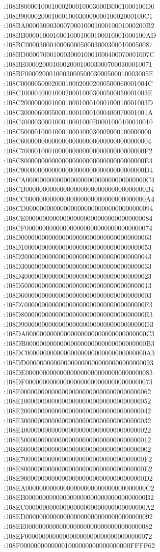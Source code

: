 :108B8000010001000200010003000B0001000100D0
:108B900002000100010003000900010002000100C1
:108BA00003000300070001000100010001000200B2
:108BB00001000100010001000100010001000100AD
:108BC0000300040006000500030003000100050087
:108BD000070001000300010001000400070001007C
:108BE0000200010002000100030007000300010071
:108BF000020001000300050003000500010003005E
:108C0000050002000100020002000500060001004C
:108C1000040001000200010003000500050001003E
:108C2000000001000100010001000100010001003D
:108C3000060005000100010001000400070001001A
:108C400003000100010001000B0001000100010010
:108C50000100010001000400030009000100000000
:108C60000000000000000000000000000000000004
:108C700001000100000000000000000000000000F2
:108C800000000000000000000000000000000000E4
:108C900000000000000000000000000000000000D4
:108CA00000000000000000000000000000000000C4
:108CB00000000000000000000000000000000000B4
:108CC00000000000000000000000000000000000A4
:108CD0000000000000000000000000000000000094
:108CE0000000000000000000000000000000000084
:108CF0000000000000000000000000000000000074
:108D00000000000000000000000000000000000063
:108D10000000000000000000000000000000000053
:108D20000000000000000000000000000000000043
:108D30000000000000000000000000000000000033
:108D40000000000000000000000000000000000023
:108D50000000000000000000000000000000000013
:108D60000000000000000000000000000000000003
:108D700000000000000000000000000000000000F3
:108D800000000000000000000000000000000000E3
:108D900000000000000000000000000000000000D3
:108DA00000000000000000000000000000000000C3
:108DB00000000000000000000000000000000000B3
:108DC00000000000000000000000000000000000A3
:108DD0000000000000000000000000000000000093
:108DE0000000000000000000000000000000000083
:108DF0000000000000000000000000000000000073
:108E00000000000000000000000000000000000062
:108E10000000000000000000000000000000000052
:108E20000000000000000000000000000000000042
:108E30000000000000000000000000000000000032
:108E40000000000000000000000000000000000022
:108E50000000000000000000000000000000000012
:108E60000000000000000000000000000000000002
:108E700000000000000000000000000000000000F2
:108E800000000000000000000000000000000000E2
:108E900000000000000000000000000000000000D2
:108EA00000000000000000000000000000000000C2
:108EB00000000000000000000000000000000000B2
:108EC00000000000000000000000000000000000A2
:108ED0000000000000000000000000000000000092
:108EE0000000000000000000000000000000000082
:108EF0000000000000000000000000000000000072
:108F00000000000001000000000000000000FFFF62